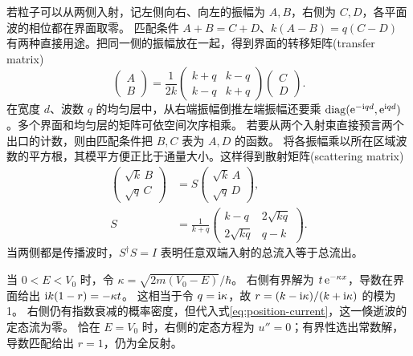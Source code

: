 若粒子可以从两侧入射，记左侧向右、向左的振幅为 $A,B$，右侧为 $C,D$，各平面波的相位都在界面取零。
匹配条件 $A + B = C + D$、$k(A - B) = q(C - D)$ 有两种直接用途。把同一侧的振幅放在一起，得到界面的转移矩阵(transfer matrix)
\begin{equation}\label{eq:qm-step-transfer-matrix}
    \begin{pmatrix}A\\B\end{pmatrix}
    = \frac1{2k}\begin{pmatrix}k + q&k - q\\k - q&k + q\end{pmatrix}
     \begin{pmatrix}C\\D\end{pmatrix}.
\end{equation}
在宽度 $d$、波数 $q$ 的均匀层中，从右端振幅倒推左端振幅还要乘
$\operatorname{diag}(\mathop{}\!\mathrm{e}^{-\mathrm{i} qd},\mathop{}\!\mathrm{e}^{\mathrm{i} qd})$。多个界面和均匀层的矩阵可依空间次序相乘。
若要从两个入射束直接预言两个出口的计数，则由匹配条件把 $B,C$ 表为 $A,D$ 的函数。
将各振幅乘以所在区域波数的平方根，其模平方便正比于通量大小。这样得到散射矩阵(scattering matrix)
\begin{subequations}\label{eq:qm-step-scattering-matrix}
    \begin{align}
        \begin{pmatrix}\sqrt{k}\,B\\ \sqrt{q}\,C\end{pmatrix}
        &= S\begin{pmatrix}\sqrt{k}\,A\\ \sqrt{q}\,D\end{pmatrix},\\
        S &= \frac1{k + q}\begin{pmatrix}k - q&2\sqrt{kq}\\2\sqrt{kq}&q - k\end{pmatrix}.
    \end{align}
\end{subequations}
当两侧都是传播波时，$S^\dagger S = I$ 表明任意双端入射的总流入等于总流出。

当 $0 < E < V_0$ 时，令 $\kappa = \sqrt{2m(V_0 - E)}/\hbar$。
右侧有界解为 $t\mathop{}\!\mathrm{e}^{-\kappa x}$，导数在界面给出 $\mathrm{i} k(1 - r) = -\kappa t$。
这相当于令 $q = \mathrm{i}\kappa$，故 $r = (k - \mathrm{i}\kappa)/(k + \mathrm{i}\kappa)$ 的模为 1。
右侧仍有指数衰减的概率密度，但代入式\eqref{eq:position-current}，这一倏逝波的定态流为零。
恰在 $E = V_0$ 时，右侧的定态方程为 $u'' = 0$；有界性选出常数解，导数匹配给出 $r = 1$，仍为全反射。

